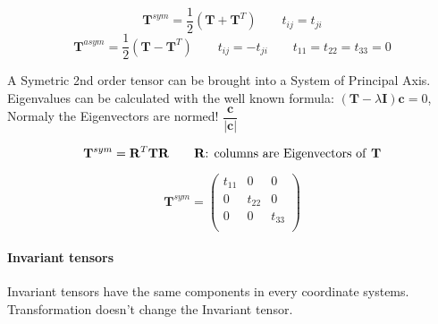 			$$	\mathbf{T}^{sym}=\frac{1}{2}\left(\mathbf{T}+\mathbf{T}^T\right) \qquad t_{ij} = t_{ji}$$
			$$	\mathbf{T}^{asym}=\frac{1}{2}\left(\mathbf{T}-\mathbf{T}^T\right) \qquad t_{ij} = -t_{ji} \qquad t_{11} = t_{22} = t_{33} = 0$$

		A Symetric 2nd order tensor can be brought into a System of Principal Axis. Eigenvalues can be calculated with the well known formula: $(\mathbf{T}-\lambda \mathbf{I})\bm c = 0$, Normaly the Eigenvectors are normed! $\dfrac{\bm c}{|\bm c|}$
		
		
		$$ \mathbf{T}^{sym} = \mathbf{R}^T \mathbf{T} \mathbf{R} \qquad \mathbf{R}\text{: columns are Eigenvectors of \textbf{T}}$$ 		
		
		$$ \mathbf{T}^{sym} = \begin{pmatrix}
		t_{11} & 0 & 0 \\ 0 & t_{22} & 0 \\ 0 & 0 & t_{33} \\
		\end{pmatrix}$$

		
		
	\paragraph{Invariant tensors} Invariant tensors have the same components in every coordinate systems. Transformation doesn't change the Invariant tensor.
	
